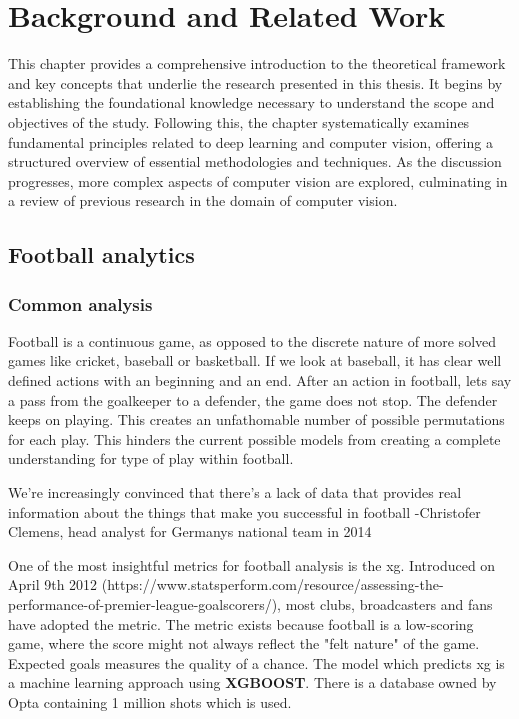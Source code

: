 \chapter{Background and Related Work}
\label{chap:background}

This chapter provides a comprehensive introduction to the theoretical framework and key concepts that underlie the research presented in this thesis. It begins by establishing the foundational knowledge necessary to understand the scope and objectives of the study. Following this, the chapter systematically examines fundamental principles related to deep learning and computer vision, offering a structured overview of essential methodologies and techniques. As the discussion progresses, more complex aspects of computer vision are explored, culminating in a review of previous research in the domain of computer vision.

\section{Football analytics}
\label{sec:football_analytics}

\subsection{Common analysis}

Football is a continuous game, as opposed to the discrete nature of more solved games like cricket, baseball or basketball. If we look at baseball, it has clear well defined actions with an beginning and an end. After an action in football, lets say a pass from the goalkeeper to a defender, the game does not stop. The defender keeps on playing. This creates an unfathomable number of possible permutations for each play. This hinders the current possible models from creating a complete understanding for type of play within football. 
\begin{displayquote} We're increasingly convinced that there's a lack of data that provides real information about the things that make you successful in football -Christofer Clemens, head analyst for Germanys national team in 2014 \end{displayquote}

One of the most insightful metrics for football analysis is the \acrfull{xg}. Introduced on April 9th 2012 (https://www.statsperform.com/resource/assessing-the-performance-of-premier-league-goalscorers/), most clubs, broadcasters and fans have adopted the metric. The metric exists because football is a low-scoring game, where the score might not always reflect the "felt nature" of the game. Expected goals measures the quality of a chance. The model which predicts \acrshort{xg} is a machine learning approach using \textbf{XGBOOST}. There is a database owned by Opta containing 1 million shots which is used. 

